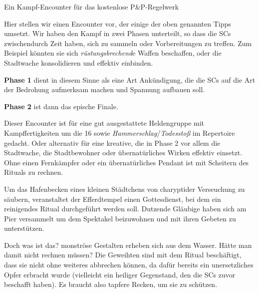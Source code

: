 \spaltenende

\vfill

\begin{flushright}
\end{flushright}

\neueseite

\begin{center}

	
    Ein Kampf-Encounter für das kostenlose P\&P-Regelwerk {}
    \normalfont \normalsize
    
   
\end{center}
\spaltenanfang

Hier stellen wir einen Encounter vor, der einige der oben genannten Tipps umsetzt.
Wir haben den Kampf in zwei Phasen unterteilt, so dass die SCs zwischendurch Zeit haben, sich zu sammeln oder Vorbereitungen zu treffen.
Zum Beispiel könnten sie sich \textit{rüstungsbrechend}e Waffen beschaffen, oder die Stadtwache konsolidieren und effektiv einbinden.

\textbf{Phase 1} dient in diesem Sinne als eine Art Ankündigung, die die SCs auf die Art der Bedrohung aufmerksam machen und Spannung aufbauen soll.

\textbf{Phase 2} ist dann das epische Finale. 

Dieser Encounter ist für eine gut ausgestattete Heldengruppe mit Kampffertigkeiten um die 16 sowie \textit{Hammerschlag}/\textit{Todesstoß} im Repertoire gedacht.
Oder alternativ für eine kreative, die in Phase 2 vor allem die Stadtwache, die Stadtbewohner oder übernatürliches Wirken effektiv einsetzt.
Ohne einen Fernkämpfer oder ein übernatürliches Pendant ist mit Scheitern des Rituals zu rechnen.


Um das Hafenbecken eines kleinen Städtchens von charyptider Verseuchung zu säubern, veranstaltet der Efferdtempel einen Gottesdienst, bei dem ein reinigendes Ritual durchgeführt werden soll.
Dutzende Gläubige haben sich am Pier versammelt um dem Spektakel beizuwohnen und mit ihren Gebeten zu unterstützen.

Doch was ist das? monströse Gestalten erheben sich aus dem Wasser. Hätte man damit nicht rechnen müssen? Die Geweihten sind mit dem Ritual beschäftigt, dass sie nicht ohne weiteres abbrechen können, da dafür bereits ein unersetzliches Opfer erbracht wurde (vielleicht ein heiliger Gegenstand, den die SCs zuvor beschafft haben).
Es braucht also tapfere Recken, um sie zu schützen.

